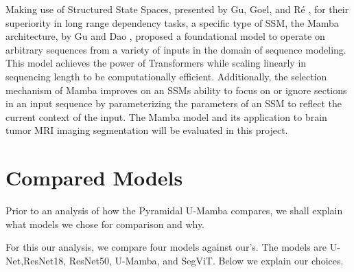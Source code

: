 \documentclass[conference]{IEEEtran}
\begin{document}
Making use of Structured State Spaces, presented by Gu, Goel, and Ré \cite{gu2022efficiently}, for their superiority in long range dependency tasks, a specific type of SSM, the Mamba architecture, by Gu and Dao \cite{gu2023mamba}, proposed a foundational model to operate on arbitrary sequences from a variety of inputs in the domain of sequence modeling. This model achieves the power of Transformers while scaling linearly in sequencing length to be computationally efficient. Additionally, the selection mechanism of Mamba improves on an SSMs ability to focus on or ignore sections in an input sequence by parameterizing the parameters of an SSM to reflect the current context of the input. The Mamba model and its application to brain tumor MRI imaging segmentation will be evaluated in this project.

\section{Compared Models}
Prior to an analysis of how the Pyramidal U-Mamba compares, we shall explain what models we chose for comparison and why.

For this our analysis, we compare four models against our's. The models are U-Net\cite{ronneberger2015unet},ResNet18, ResNet50, U-Mamba\cite{U-Mamba}, and SegViT\cite{dosovitskiy2021image}. Below we explain our choices.
\end{document}
